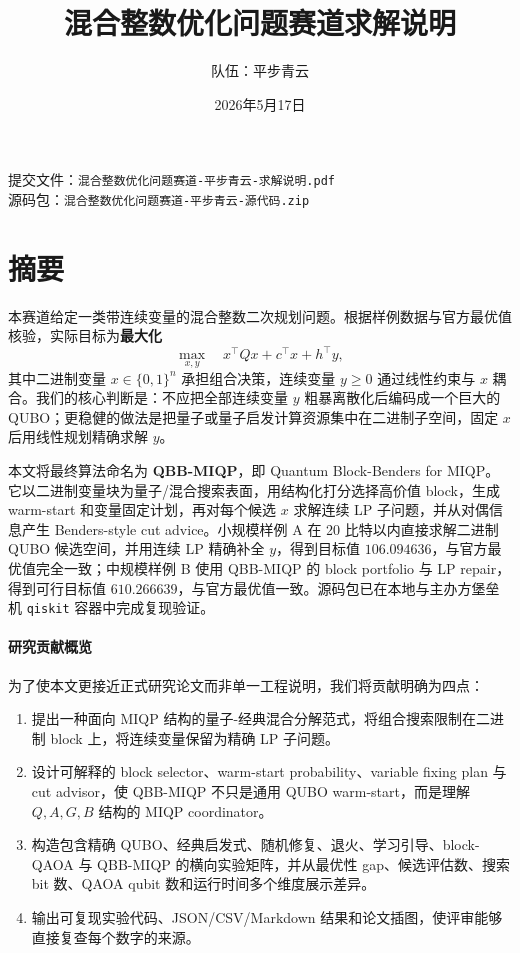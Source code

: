 \documentclass[UTF8,a4paper,11pt]{ctexart}
\title{\textbf{混合整数优化问题赛道求解说明}}
\author{队伍：平步青云}
\date{2026年5月17日}
\begin{document}
\maketitle

\begin{center}
\small
提交文件：\texttt{混合整数优化问题赛道-平步青云-求解说明.pdf}\\
源码包：\texttt{混合整数优化问题赛道-平步青云-源代码.zip}
\end{center}

\tableofcontents
\newpage

\section{摘要}

本赛道给定一类带连续变量的混合整数二次规划问题。根据样例数据与官方最优值核验，实际目标为\textbf{最大化}
\[
\max_{x,y}\quad x^\top Qx+c^\top x+h^\top y,
\]
其中二进制变量 $x\in\{0,1\}^n$ 承担组合决策，连续变量 $y\ge 0$ 通过线性约束与 $x$ 耦合。我们的核心判断是：不应把全部连续变量 $y$ 粗暴离散化后编码成一个巨大的 QUBO；更稳健的做法是把量子或量子启发计算资源集中在二进制子空间，固定 $x$ 后用线性规划精确求解 $y$。

本文将最终算法命名为 \textbf{QBB-MIQP}，即 Quantum Block-Benders for MIQP。它以二进制变量块为量子/混合搜索表面，用结构化打分选择高价值 block，生成 warm-start 和变量固定计划，再对每个候选 $x$ 求解连续 LP 子问题，并从对偶信息产生 Benders-style cut advice。小规模样例 A 在 20 比特以内直接求解二进制 QUBO 候选空间，并用连续 LP 精确补全 $y$，得到目标值 $106.094636$，与官方最优值完全一致；中规模样例 B 使用 QBB-MIQP 的 block portfolio 与 LP repair，得到可行目标值 $610.266639$，与官方最优值一致。源码包已在本地与主办方堡垒机 \texttt{qiskit} 容器中完成复现验证。

\paragraph{研究贡献概览}
为了使本文更接近正式研究论文而非单一工程说明，我们将贡献明确为四点：

\begin{enumerate}
  \item 提出一种面向 MIQP 结构的量子-经典混合分解范式，将组合搜索限制在二进制 block 上，将连续变量保留为精确 LP 子问题。
  \item 设计可解释的 block selector、warm-start probability、variable fixing plan 与 cut advisor，使 QBB-MIQP 不只是通用 QUBO warm-start，而是理解 $Q,A,G,B$ 结构的 MIQP coordinator。
  \item 构造包含精确 QUBO、经典启发式、随机修复、退火、学习引导、block-QAOA 与 QBB-MIQP 的横向实验矩阵，并从最优性 gap、候选评估数、搜索 bit 数、QAOA qubit 数和运行时间多个维度展示差异。
  \item 输出可复现实验代码、JSON/CSV/Markdown 结果和论文插图，使评审能够直接复查每个数字的来源。
\end{enumerate}
\end{document}
